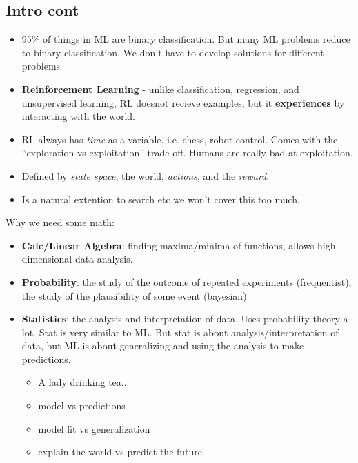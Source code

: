 \subsection{Intro cont}
\begin{itemize}
\item 95\% of things in ML are binary classification. But many ML
  problems reduce to binary classification. We don't have to develop
  solutions for different problems
\item \textbf{Reinforcement Learning }- unlike classification, regression, and
  unsupervised learning, RL doesnot recieve examples, but it
  \textbf{experiences} by interacting with the world.
\item RL always has \emph{time} as a variable. i.e. chess, robot
  control. Comes with the ``exploration vs exploitation''
  trade-off. Humans are really bad at exploitation.
\item Defined by \emph{state space}, the world, \emph{actions}, and
  the \emph{reward}.
\item Is a natural extention to search etc we won't cover this too much.
\end{itemize}

Why we need some math:
\begin{itemize}
\item \textbf{Calc/Linear Algebra}: finding maxima/minima of
  functions, allows high-dimensional data analysis.
\item \textbf{Probability}: the study of the outcome of repeated
  experiments (frequentist), the study of the plausibility of some
  event (bayesian)
\item \textbf{Statistics}: the analysis and interpretation of
  data. Uses probability theory a lot. Stat is very similar to ML. But
  stat is about analysis/interpretation of data, but ML is about
  generalizing and using the analysis to make predictions.
  \begin{itemize}
  \item A lady drinking tea..
  \item model vs predictions
  \item model fit vs generalization
  \item explain the world vs predict the future
  \end{itemize}
\end{itemize}

